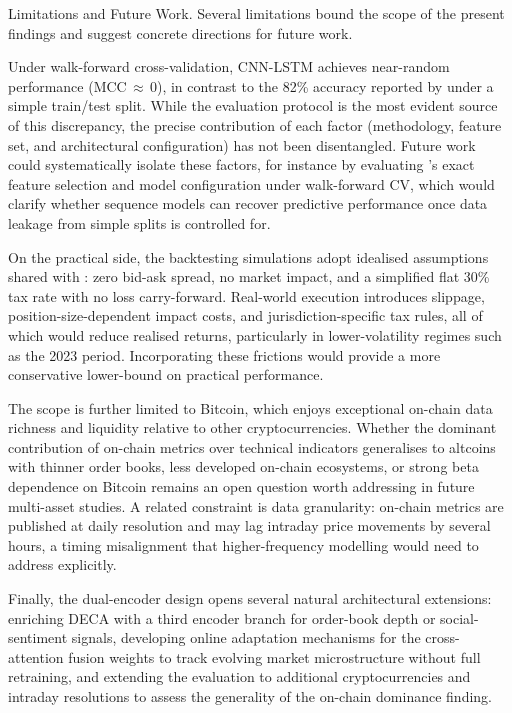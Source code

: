 \documentclass[final,3p,times,authoryear]{elsarticle}
\begin{document}
\noindent Limitations and Future Work.
Several limitations bound the scope of the present findings and suggest
concrete directions for future work.

Under walk-forward cross-validation, CNN-LSTM achieves near-random
performance (MCC\,$\approx$\,0), in contrast to the 82\% accuracy
reported by \citet{omole2025eaai} under a simple train/test split.
While the evaluation protocol is the most evident source of this
discrepancy, the precise contribution of each factor (methodology, feature set,
and architectural configuration) has not been disentangled. Future work could systematically isolate these factors,
for instance by evaluating \citeauthor{omole2025eaai}'s exact feature
selection and model configuration under walk-forward CV, which would
clarify whether sequence models can recover predictive performance
once data leakage from simple splits is controlled for.

On the practical side, the backtesting simulations adopt idealised
assumptions shared with \citet{omole2025eaai}: zero bid-ask spread, no
market impact, and a simplified flat 30\% tax rate with no loss
carry-forward.
Real-world execution introduces slippage, position-size-dependent
impact costs, and jurisdiction-specific tax rules, all of which would
reduce realised returns, particularly in lower-volatility regimes such
as the 2023 period.
Incorporating these frictions would provide a more conservative
lower-bound on practical performance.

The scope is further limited to Bitcoin, which enjoys exceptional
on-chain data richness and liquidity relative to other cryptocurrencies.
Whether the dominant contribution of on-chain metrics over technical
indicators generalises to altcoins with thinner order books, less
developed on-chain ecosystems, or strong beta dependence on Bitcoin remains
an open question worth addressing in future multi-asset studies.
A related constraint is data granularity: on-chain metrics are published
at daily resolution and may lag intraday price movements by several hours,
a timing misalignment that higher-frequency modelling would need to
address explicitly.

Finally, the dual-encoder design opens several natural architectural
extensions: enriching DECA with a third encoder branch for order-book
depth or social-sentiment signals, developing online adaptation
mechanisms for the cross-attention fusion weights to track evolving
market microstructure without full retraining, and extending the
evaluation to additional cryptocurrencies and intraday resolutions to
assess the generality of the on-chain dominance finding.
\end{document}
